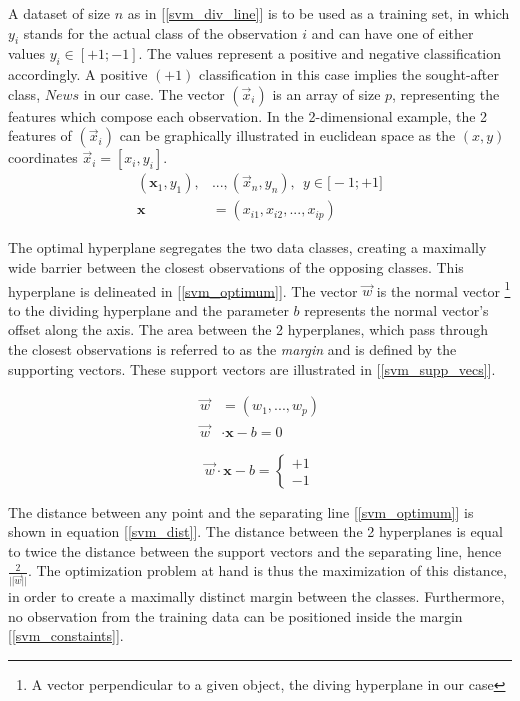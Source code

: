  A dataset of size $n$ as in [\ref{svm_div_line}] is to be used as a training set, in which $y_i$ stands for the actual class of the observation $i$ and can have one of either values $y_i \in [+1;-1] $. The values represent a positive and negative classification accordingly. A positive $(+1)$ classification in this case implies the sought-after class, $News$ in our case. The vector $(\vec{x}_i)$ is an array of size $p$, representing the features which compose each observation. In the 2-dimensional example, the 2 features of $(\vec{x}_i)$ can be graphically illustrated in euclidean space as the $(x,y)$ coordinates $\vec{x}_i = [x_i,y_i]$. 
	\begin{equation}
		\begin{aligned}
			(\textbf{x}_1,y_1),& ... , (\vec{x}_n,y_n), \ \ y \in \big[-1;+1 \big] \\
			\textbf{x}& = (x_{i1},x_{i2}, ...,x_{ip})
		\end{aligned}
	\label{svm_div_line}
	\end{equation}
	
	The optimal hyperplane segregates the two data classes, creating a maximally wide barrier between the closest observations of the opposing classes. This hyperplane is delineated in [\ref{svm_optimum}]. The vector $\vec{w}$ is the normal vector \footnote{A vector perpendicular to a given object, the diving hyperplane in our case} to the dividing hyperplane and the parameter $b$ represents the normal vector's offset along the axis. The area between the 2 hyperplanes, which pass through the closest observations is referred to as the \textit{margin} and is defined by the supporting vectors. These support vectors are illustrated in [\ref{svm_supp_vecs}].
	
	\begin{equation}
		\begin{aligned}
			\vec{w}& = (w_1, ... , w_p) \\
			\vec{w}& \cdot \textbf{x} - b = 0 
		\end{aligned}
		\label{svm_optimum}
	\end{equation}
	
	\begin{equation}
		\vec{w} \cdot \textbf{x} - b = 
		\begin{cases}
			+1 \\
			-1 
		\end{cases}
		\label{svm_supp_vecs}
	\end{equation}
	
	The distance between any point and the separating line [\ref{svm_optimum}] is shown in equation [\ref{svm_dist}]. The distance between the 2 hyperplanes is equal to twice the distance between the support vectors and the separating line, hence $ \frac{2}{||\vec{w}||} $. The optimization problem at hand is thus the maximization of this distance, in order to create a maximally distinct margin between the classes. Furthermore, no observation from the training data can be positioned inside the margin [\ref{svm_constaints}].
	
